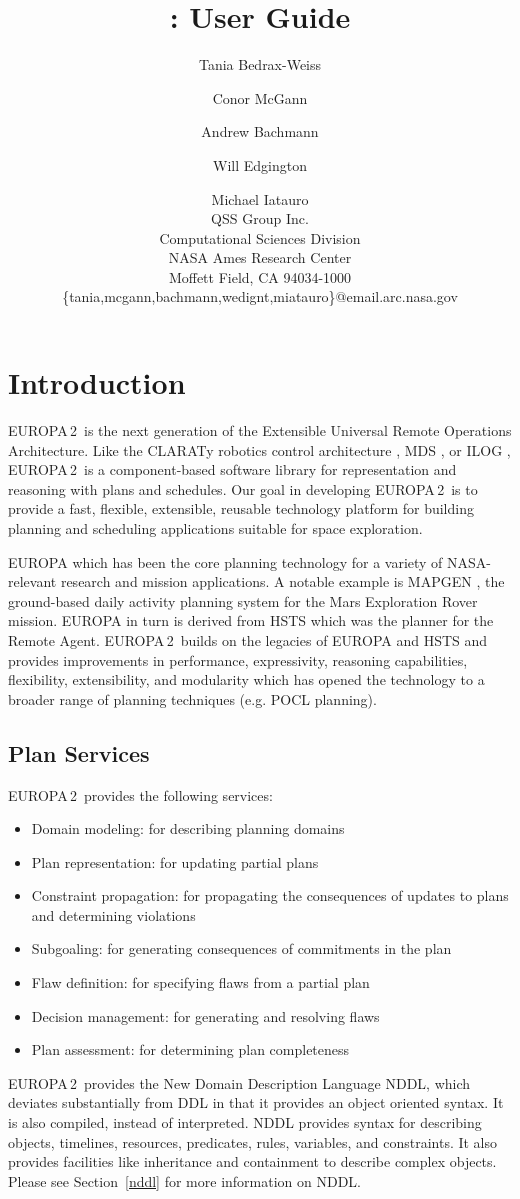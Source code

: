 \documentclass[10pt, letterpaper, twoside]{article}
\author{Tania Bedrax-Weiss \and Conor McGann \and Andrew Bachmann \and Will Edgington \and Michael Iatauro \\
QSS Group Inc. \\
Computational Sciences Division \\
NASA Ames Research Center \\
Moffett Field, CA 94034-1000 \\
\{tania,mcgann,bachmann,wedignt,miatauro\}@email.arc.nasa.gov
}
\title{\ET: User Guide}
\begin{document}
\newcommand{\ET}{EUROPA\,2}

\maketitle

\tableofcontents

\section{Introduction}
\ET\, is the next generation of the Extensible Universal Remote
Operations Architecture.  Like the CLARATy robotics control architecture
\cite{kn:Ne}, MDS \cite{MDS}, or ILOG \cite{ILOG}, \ET\, is a
component-based software library for representation and reasoning with
plans and schedules. Our goal in developing \ET\, is to provide a fast,
flexible, extensible, reusable technology platform for building planning
and scheduling applications suitable for space exploration.

EUROPA \cite{caip,plan} which has been the core planning technology for a
variety of NASA-relevant research and mission applications. A notable
example is MAPGEN \cite{mapgen}, the ground-based daily activity planning
system for the Mars Exploration Rover mission. EUROPA in turn is derived
from HSTS which was the planner for the Remote Agent\cite{ra}. \ET\,
builds on the legacies of EUROPA and HSTS and provides improvements in
performance, expressivity, reasoning capabilities, flexibility,
extensibility, and modularity which has opened the technology to a broader
range of planning techniques (e.g. POCL planning).

\subsection{Plan Services}
\ET\, provides the following services:
\begin{itemize}
\item Domain modeling: for describing planning domains
\item Plan representation: for updating partial plans 
\item Constraint propagation: for propagating the consequences of updates
to plans and determining violations
\item Subgoaling: for generating consequences of commitments in the plan
\item Flaw definition: for specifying flaws from a partial plan
\item Decision management: for generating and resolving flaws
\item Plan assessment: for determining plan completeness
\end{itemize}
\ET\, provides the New Domain Description Language NDDL, which deviates
substantially from DDL in that it provides an object oriented syntax.  It
is also compiled, instead of interpreted.  NDDL provides syntax for
describing objects, timelines, resources, predicates, rules, variables, and
constraints. It also provides facilities like inheritance and containment
to describe complex objects.  Please see Section~\ref{nddl} for more
information on NDDL. 
\end{document}
